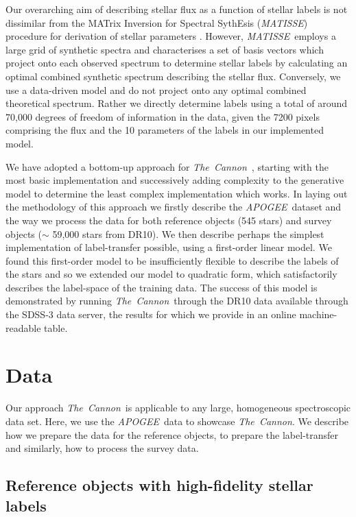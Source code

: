 \documentclass[12pt, preprint]{aastex}
\newcommand{\tc}{\textsl{The~Cannon}}
\newcommand{\apogee}{\textsl{APOGEE}}
\newcommand{\matisse}{\textsl{MATISSE}}
\begin{document}
Our overarching aim of describing stellar flux as a function of stellar labels is not dissimilar from the MATrix Inversion for Spectral SythEsis (\matisse) procedure for derivation of stellar parameters \citep{RB2006}. 
However, \matisse\ employs a large grid of synthetic spectra and characterises a set of basis vectors which project onto each observed spectrum to determine stellar labels by calculating an optimal combined synthetic spectrum describing the stellar flux. 
Conversely, we use a data-driven model and do not project onto any optimal combined theoretical spectrum. 
Rather we directly determine labels using a total of around 70,000 degrees of freedom of information in the data, given the 7200 pixels comprising the flux and the 10 parameters of the labels in our implemented model. 

We have adopted a bottom-up approach for \tc\ , starting with the most basic implementation and successively adding complexity to the generative model to determine the least complex implementation which works.  
In laying out the methodology of this approach we firstly describe the \apogee\ dataset and the way we process the data for both reference objects (545 stars) and survey objects ($\sim$ 59,000 stars from DR10). 
We then describe perhaps the simplest implementation of label-transfer possible, using a first-order linear model. We found this first-order model to be insufficiently flexible to describe the labels of the stars and so we extended our model to quadratic form, which satisfactorily describes the label-space of the training data.
The success of this model is demonstrated by running \tc\ through the DR10 data available through the SDSS-3 data server, the results for which we provide in an online machine-readable table. %

\section{Data}

Our approach \tc \ is applicable to any large, homogeneous spectroscopic data set. Here, we use the \apogee\ data to showcase \tc . 
We describe how we prepare the data for the reference objects, to prepare the label-transfer and similarly, how to process the survey data.

\subsection{Reference objects with high-fidelity stellar labels}
\end{document}
